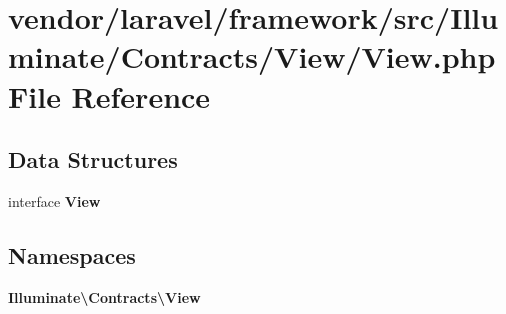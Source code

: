 \section{vendor/laravel/framework/src/\+Illuminate/\+Contracts/\+View/\+View.php File Reference}
\label{vendor_2laravel_2framework_2src_2_illuminate_2_contracts_2_view_2view_8php}
\subsection*{Data Structures}
\begin{DoxyCompactItemize}
\item 
interface {\bf View}
\end{DoxyCompactItemize}
\subsection*{Namespaces}
\begin{DoxyCompactItemize}
\item 
 {\bf Illuminate\textbackslash{}\+Contracts\textbackslash{}\+View}
\end{DoxyCompactItemize}
